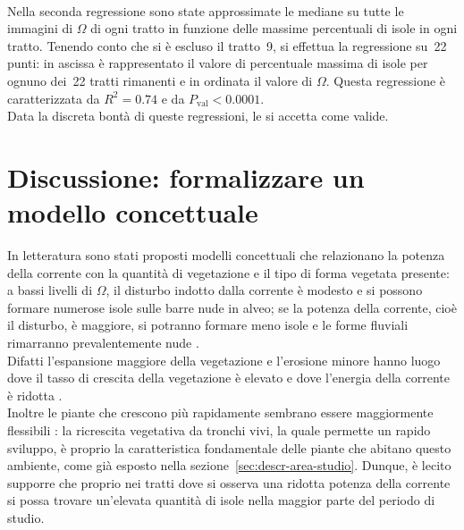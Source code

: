 \\
Nella seconda regressione sono state approssimate le mediane su tutte le immagini di $\Omega$ di ogni tratto in funzione delle massime percentuali di isole in ogni tratto. Tenendo conto che si è escluso il tratto~9, si effettua la regressione su~22 punti: in ascissa è rappresentato il valore di percentuale massima di isole per ognuno dei~22 tratti rimanenti e in ordinata il valore di $\Omega$.
Questa regressione è caratterizzata da $R^2 = 0.74$ e da $P_\mathrm{val} < 0.0001$.
\\
Data la discreta bontà di queste regressioni, le si accetta come valide.

\section{Discussione: formalizzare un modello concettuale}
In letteratura sono stati proposti modelli concettuali che relazionano la potenza della corrente con la quantità di vegetazione e il tipo di forma vegetata presente:
a bassi livelli di $\Omega$, il disturbo indotto dalla corrente è modesto e si possono formare numerose isole sulle barre nude in alveo;
se la potenza della corrente, cioè il disturbo, è maggiore, si potranno formare meno isole e le forme fluviali rimarranno prevalentemente nude .
\\
Difatti l'espansione maggiore della vegetazione e l'erosione minore hanno luogo dove il tasso di crescita della vegetazione è elevato e dove l'energia della corrente è ridotta .
\\
Inoltre le piante che crescono più rapidamente sembrano essere maggiormente flessibili : la ricrescita vegetativa da tronchi vivi, la quale permette un rapido sviluppo, è proprio la caratteristica fondamentale delle piante che abitano questo ambiente, come già esposto nella sezione~\ref{sec:descr-area-studio}.
Dunque, è lecito supporre che proprio nei tratti dove si osserva una ridotta potenza della corrente si possa trovare un'elevata quantità di isole nella maggior parte del periodo di studio.

